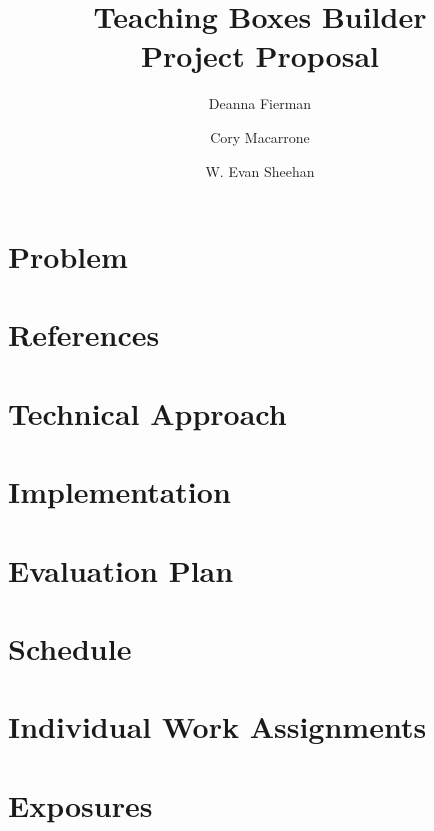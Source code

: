 \documentclass[11pt,letter]{article}
\title{Teaching Boxes Builder\\Project Proposal}
\author{Deanna Fierman \and Cory Macarrone \and W. Evan Sheehan}
\begin{document}
\maketitle

\section{Problem}

\section{References}

\section{Technical Approach}

\section{Implementation}

\section{Evaluation Plan}

\section{Schedule}

\section{Individual Work Assignments}

\section{Exposures}
\end{document}
